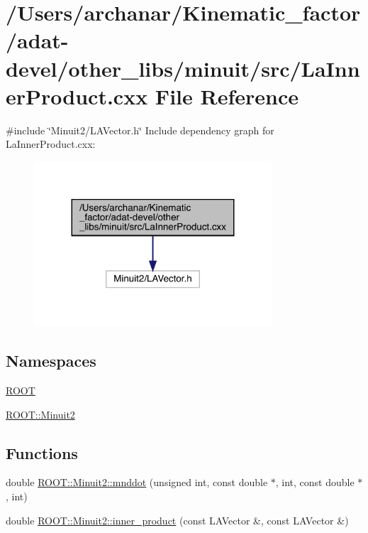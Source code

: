 \hypertarget{adat-devel_2other__libs_2minuit_2src_2LaInnerProduct_8cxx}{}\section{/\+Users/archanar/\+Kinematic\+\_\+factor/adat-\/devel/other\+\_\+libs/minuit/src/\+La\+Inner\+Product.cxx File Reference}
\label{adat-devel_2other__libs_2minuit_2src_2LaInnerProduct_8cxx}
{\ttfamily \#include \char`\"{}Minuit2/\+L\+A\+Vector.\+h\char`\"{}}\newline
Include dependency graph for La\+Inner\+Product.\+cxx\+:
\nopagebreak
\begin{figure}[H]
\begin{center}
\leavevmode
\includegraphics[width=251pt]{d3/d0b/adat-devel_2other__libs_2minuit_2src_2LaInnerProduct_8cxx__incl}
\end{center}
\end{figure}
\subsection*{Namespaces}
\begin{DoxyCompactItemize}
\item 
 \mbox{\hyperlink{namespaceROOT}{R\+O\+OT}}
\item 
 \mbox{\hyperlink{namespaceROOT_1_1Minuit2}{R\+O\+O\+T\+::\+Minuit2}}
\end{DoxyCompactItemize}
\subsection*{Functions}
\begin{DoxyCompactItemize}
\item 
double \mbox{\hyperlink{namespaceROOT_1_1Minuit2_a2226faf256d69bf5b922caad1380c34e}{R\+O\+O\+T\+::\+Minuit2\+::mnddot}} (unsigned int, const double $\ast$, int, const double $\ast$, int)
\item 
double \mbox{\hyperlink{namespaceROOT_1_1Minuit2_ac47f2faa5fce723ec08365b174b5035d}{R\+O\+O\+T\+::\+Minuit2\+::inner\+\_\+product}} (const L\+A\+Vector \&, const L\+A\+Vector \&)
\end{DoxyCompactItemize}
